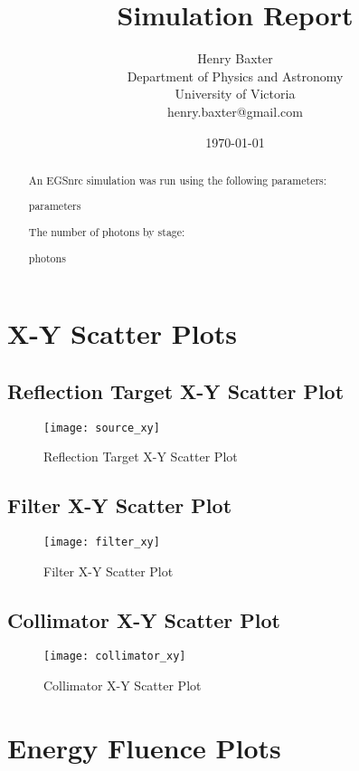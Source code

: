 \documentclass[12pt]{article}
\title{Simulation Report}
\author{
        Henry Baxter \\
                Department of Physics and Astronomy\\
        University of Victoria\\
        henry.baxter@gmail.com
}
\date{\today}
\begin{document}
\maketitle

\begin{abstract}
An EGSnrc simulation was run using the following parameters:
\begin{itemize}
	{{parameters}}
\end{itemize}
The number of photons by stage:
\begin{enumerate}
	{{photons}}
\end{enumerate}
\end{abstract}

\clearpage

\tableofcontents



\section{X-Y Scatter Plots}

\subsection{Reflection Target X-Y Scatter Plot}
\begin{figure}[H]
\centering
\texttt{[image: source\_xy]}
\caption{Reflection Target X-Y Scatter Plot}
\label{fig:source_xy}
\end{figure}

\subsection{Filter X-Y Scatter Plot}
\begin{figure}[H]
\centering
\texttt{[image: filter\_xy]}
\caption{Filter X-Y Scatter Plot}
\label{fig:filter_xy}
\end{figure}

\subsection{Collimator X-Y Scatter Plot}
\begin{figure}[H]
\centering
\texttt{[image: collimator\_xy]}
\caption{Collimator X-Y Scatter Plot}
\label{fig:collimator_xy}
\end{figure}



\section{Energy Fluence Plots}
\end{document}
